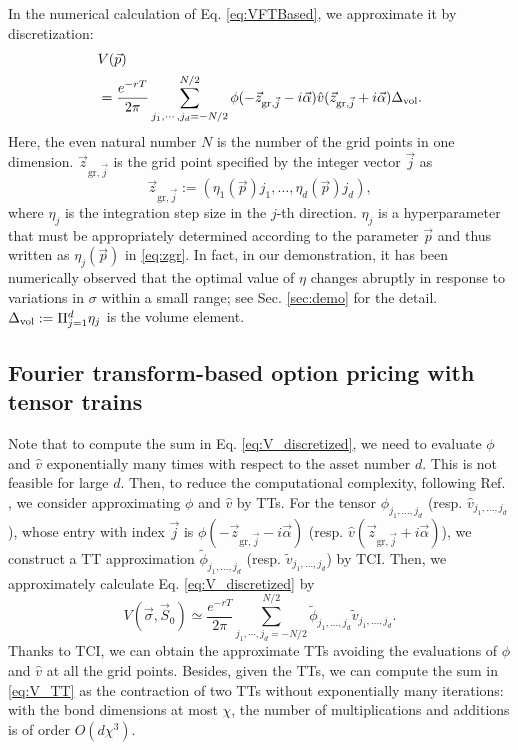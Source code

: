 In the numerical calculation of Eq. \eqref{eq:VFTBased}, we approximate it by discretization:
\begin{align}
    &V(\vec{p}) \nonumber \\ 
    &= \frac{e^{-rT}}{2\pi} \sum_{j_1, \cdots, j_d=-N/2}^{N/2} \phi(-\vec{z}_{\mathrm{gr},\vec{j}} - i \vec{\alpha}) \hat{v} (\vec{z}_{\mathrm{gr},\vec{j}} + i\vec{\alpha}) \Delta_{\rm vol}.
\label{eq:V_discretized}
\end{align}
Here, the even natural number $N$ is the number of the grid points in one dimension.
$\vec{z}_{\mathrm{gr},\vec{j}}$ is the grid point specified by the integer vector $\vec{j}$ as
\begin{equation}
    \vec{z}_{\mathrm{gr},\vec{j}}:=(\eta_1(\vec{p}) j_1,\ldots,\eta_d(\vec{p}) j_d),
    \label{eq:zgr}
\end{equation}
where $\eta_j$ is the integration step size in the $j$-th direction. 
$\eta_j$ is a hyperparameter that must be appropriately determined according to the parameter $\vec{p}$ and thus written as $\eta_j(\vec{p})$ in \eqref{eq:zgr}. In fact, in our demonstration, it has been numerically observed that the optimal value of $\eta$ changes abruptly in response to variations in $\sigma$ within a small range; see Sec. \ref{sec:demo} for the detail.
$\Delta_{\rm vol}:=\Pi_{j=1}^d \eta_j$ is the volume element.


\subsection{Fourier transform-based option pricing with tensor trains}

Note that to compute the sum in Eq. \eqref{eq:V_discretized}, we need to evaluate $\phi$ and $\hat{v}$ exponentially many times with respect to the asset number $d$.
This is not feasible for large $d$.
Then, to reduce the computational complexity, following Ref. \cite{kastoryano2022highly}, we consider approximating $\phi$ and $\hat{v}$ by TTs.
For the tensor $\phi_{j_1,\ldots,j_d}$ (resp. $\hat{v}_{j_1,\ldots,j_d}$), whose entry with index $\vec{j}$ is $\phi(-\vec{z}_{\mathrm{gr},\vec{j}} - i \vec{\alpha})$ (resp. $\hat{v} (\vec{z}_{\mathrm{gr},\vec{j}} + i\vec{\alpha})$), we construct a TT approximation $\tilde{\phi}_{j_1,\ldots,j_d}$ (resp. $\tilde{v}_{j_1,\ldots,j_d}$) by TCI.
Then, we approximately calculate Eq. \eqref{eq:V_discretized} by
\begin{equation}
    V(\vec{\sigma},\vec{S}_0) \simeq \frac{e^{-rT}}{2\pi} \sum_{j_1, \cdots, j_d=-N/2}^{N/2} \tilde{\phi}_{j_1,\ldots,j_d}\tilde{v}_{j_1,\ldots,j_d}.
\label{eq:V_TT}
\end{equation}
Thanks to TCI, we can obtain the approximate TTs avoiding the evaluations of $\phi$ and $\hat{v}$ at all the grid points.
Besides, given the TTs, we can compute the sum in \eqref{eq:V_TT} as the contraction of two TTs without exponentially many iterations: with the bond dimensions at most $\chi$, the number of multiplications and additions is of order $O(d\chi^3)$.

